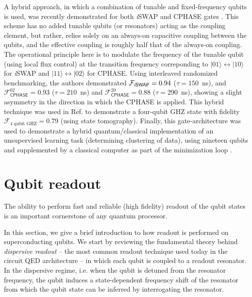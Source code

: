 \documentclass[aip,apr,twocolumn,showpacs,superscriptaddress,groupedaddress,nofootinbib,reprint]{revtex4-1}  %
\newcommand{\iSWAP}{\emph{i}\textsf{SWAP}}
\newcommand{\CPHASE}{\textsf{CPHASE}}
\begin{document}
A hybrid approach, in which a combination of tunable and fixed-frequency qubits is used, was recently demonstrated for both \iSWAP{} and \CPHASE{} gates \cite{Caldwell2017,Reagor2018,Didier2018a}. This scheme has no added tunable qubits (or resonators) acting as the coupling element, but rather, relies solely on an always-on capacitive coupling between the qubits, and the effective coupling is roughly half that of the always-on coupling. The operational principle here is to modulate the frequency of the tunable qubit (using local flux control) at the transition frequency correponding to $|01\rangle \leftrightarrow |10\rangle$ for \iSWAP{} and $|11\rangle \leftrightarrow |02\rangle$ for \CPHASE{}. Using interleaved randomized benchmarking, the authors demonstrated $\mathcal F_{\iSWAP{}} = 0.94$ ($\tau = 150$~ns), and $\mathcal F^{02}_{\CPHASE{}} = 0.93$ ($\tau = 210$~ns) and $\mathcal F^{20}_{\CPHASE{}} = 0.88$ ($\tau = 290$~ns), showing a slight asymmetry in the direction in which the \CPHASE{} is applied. This hybrid technique was used in Ref. to demonstrate a four-qubit GHZ state with fidelity $\mathcal F_\text{4 qubit GHZ} = 0.79$ (using state tomography). Finally, this gate-architecture was used to demonstrate a hybrid quantum/classical implementation of an unsupervised learning task (determining clustering of data), using nineteen qubits and supplemented by a classical computer as part of the minimization loop \cite{Otterbach2017}.


\section{\label{sec:readout}Qubit readout}

\noindent The ability to perform fast and reliable (high fidelity) readout of the qubit states is an important cornerstone of any quantum processor\cite{DiVincenzo2000}.

In this section, we give a brief introduction to how readout is performed on superconducting qubits. We start by reviewing the fundamental theory behind \textit{dispersive readout} -- the most common readout technique used today in the circuit QED architecture -- in which each qubit is coupled to a readout resonator. In the dispersive regime, i.e. when the qubit is detuned from the resonator frequency, the qubit induces a state-dependent frequency shift of the resonator from which the qubit state can be inferred by interrogating the resonator.
\end{document}
